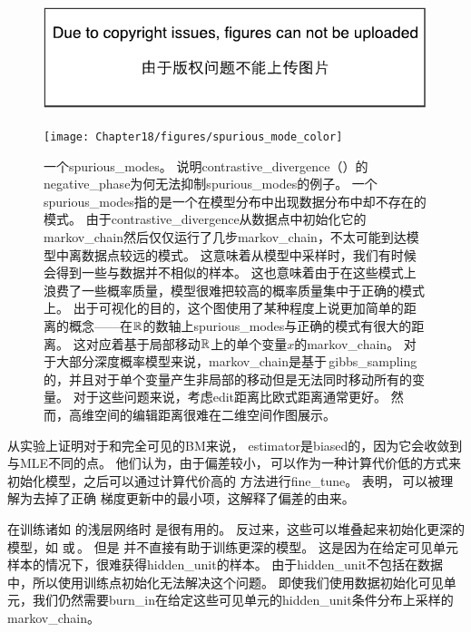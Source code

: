 \begin{figure}[!htb]
\ifOpenSource
\centerline{\includegraphics{figure.pdf}}
\else
\centerline{\texttt{[image: Chapter18/figures/spurious\_mode\_color]}}
\fi
\caption{一个\gls{spurious_modes}。
说明\gls{contrastive_divergence}（）的\gls{negative_phase}为何无法抑制\gls{spurious_modes}的例子。
一个\gls{spurious_modes}指的是一个在模型分布中出现数据分布中却不存在的模式。
由于\gls{contrastive_divergence}从数据点中初始化它的\gls{markov_chain}然后仅仅运行了几步\gls{markov_chain}，不太可能到达模型中离数据点较远的模式。
这意味着从模型中采样时，我们有时候会得到一些与数据并不相似的样本。
这也意味着由于在这些模式上浪费了一些概率质量，模型很难把较高的概率质量集中于正确的模式上。
出于可视化的目的，这个图使用了某种程度上说更加简单的距离的概念——在$\mathbb{R}$的数轴上\gls{spurious_modes}与正确的模式有很大的距离。
这对应着基于局部移动$\mathbb{R}$上的单个变量$x$的\gls{markov_chain}。
对于大部分深度概率模型来说，\gls{markov_chain}是基于\,\gls{gibbs_sampling}的，并且对于单个变量产生非局部的移动但是无法同时移动所有的变量。
对于这些问题来说，考虑edit距离比欧式距离通常更好。
然而，高维空间的编辑距离很难在二维空间作图展示。}
\label{fig:chap18_spurious_mode}
\end{figure}

\cite{Perpinan+Hinton-2005-small}从实验上证明对于和完全可见的\gls{BM}来说，\,\,\gls{estimator}是\gls{biased}的，因为它会收敛到与\gls{MLE}不同的点。
他们认为，由于偏差较小，\,可以作为一种计算代价低的方式来初始化模型，之后可以通过计算代价高的\,\,方法进行\gls{fine_tune}。
\cite{Bengio+Delalleau-2009}表明，\,可以被理解为去掉了正确\,\,梯度更新中的最小项，这解释了偏差的由来。


在训练诸如\,\,的浅层网络时\,\,是很有用的。
反过来，这些可以堆叠起来初始化更深的模型，如\,\,或\,。
但是\,\,并不直接有助于训练更深的模型。
这是因为在给定可见单元样本的情况下，很难获得\gls{hidden_unit}的样本。
由于\gls{hidden_unit}不包括在数据中，所以使用训练点初始化无法解决这个问题。
即使我们使用数据初始化可见单元，我们仍然需要\gls{burn_in}在给定这些可见单元的\gls{hidden_unit}条件分布上采样的\gls{markov_chain}。

